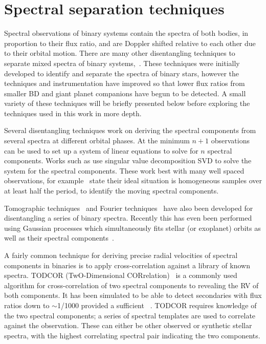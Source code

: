 
\section{Spectral separation techniques}
\label{sec:disentangling_techniques}

Spectral observations of binary systems contain the spectra of both bodies, in proportion to their flux ratio, and are Doppler shifted relative to each other due to their orbital motion.
There are many other disentangling techniques to separate mixed spectra of binary systems,~\citep[e.g.][and references therein]{hadrava_disentangling_2009}.
These techniques were initially developed to identify and separate the spectra of binary stars, however the techniques and instrumentation have improved so that lower flux ratios from smaller BD and giant planet companions have begun to be detected.
A small variety of these techniques will be briefly presented below before exploring the techniques used in this work in more depth.

Several disentangling techniques work on deriving the spectral components from several spectra at different orbital phases.
At the minimum \(n+1\) observations can be used to set up a system of linear equations to solve for \(n\) spectral components.
Works such as \citet[][]{simon_disentangling_1994, sablowski_spectral_2016} use singular value decomposition {SVD} to solve the system for the spectral components.
These work best with many well spaced observations, for example~\citet{sablowski_spectral_2016} state their ideal situation is homogeneous samples over at least half the period, to identify the moving spectral components.

Tomographic techniques~\citep[e.g.][]{bagnuolo_tomographic_1991} and Fourier techniques~\citep{hadrava_orbital_1995} have also been developed for disentangling a series of binary spectra.
Recently this has even been performed using Gaussian processes which simultaneously fits stellar (or exoplanet) orbits as well as their spectral components~\citep{czekala_disentangling_2017}.

A fairly common technique for deriving precise radial velocities of spectral components in binaries is to apply cross-correlation against a library of known spectra.
{TODCOR} (TwO-Dimensional CORrelation)~\citep{zucker_study_1994} is a commonly used algorithm for cross-correlation of two spectral components to revealing the {RV} of both components.
It has been simulated to be able to detect secondaries with flux ratios down to \(\sim\)1/1000 provided a sufficient \snr{}~\citep[e.g.][]{mazeh_todcor_1994,mazeh_detecting_1997}.
{TODCOR} requires knowledge of the two spectral components; a series of spectral templates are used to correlate against the observation.
These can either be other observed or synthetic stellar spectra, with the highest correlating spectral pair indicating the two components.

